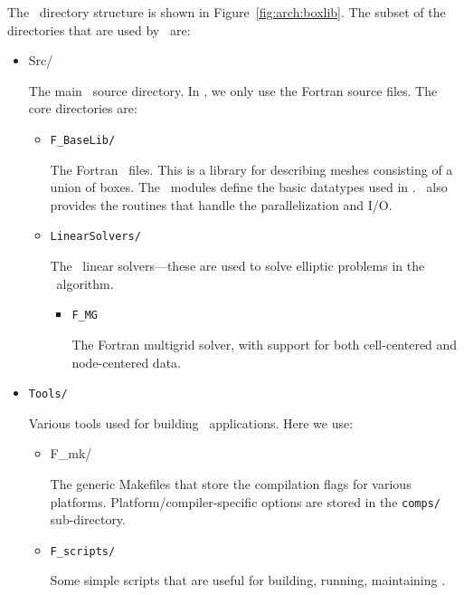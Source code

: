 The \boxlib\ directory structure is shown in
Figure~\ref{fig:arch:boxlib}.  The subset of the directories that are
used by \maestro\ are:
\begin{itemize}
\item {Src/}

  The main \boxlib\ source directory.  In \maestro, we only use the
  Fortran source files.  The core directories are:

  \begin{itemize}

  \item {\tt F\_BaseLib/} 

    The Fortran \boxlib\ files.  This is a library for describing
    meshes consisting of a union of boxes.  The \boxlib\ modules
    define the basic datatypes used in \maestro.  \boxlib\ also
    provides the routines that handle the parallelization and I/O.

  \item {\tt LinearSolvers/}

    The \boxlib\ linear solvers---these are used to solve elliptic
    problems in the \maestro\ algorithm.

    \begin{itemize}

    \item {\tt F\_MG}

      The Fortran multigrid solver, with support for both
      cell-centered and node-centered data.

    \end{itemize}

  \end{itemize}

\item {\tt Tools/}

  Various tools used for building \boxlib\ applications.  Here we use:

  \begin{itemize}

  \item {F\_mk/}

    The generic Makefiles that store the compilation flags for various
    platforms.  Platform/compiler-specific options are stored in the
    {\tt comps/} sub-directory.

  \item {\tt F\_scripts/}

    Some simple scripts that are useful for building, running,
    maintaining \maestro.

  \end{itemize}

\end{itemize}


